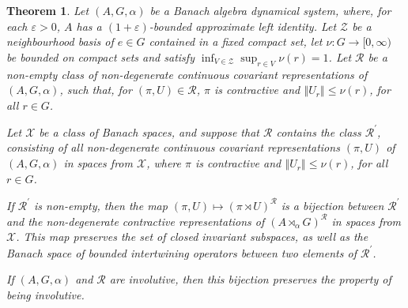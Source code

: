 \documentclass{amsart}
\theoremstyle{plain}
\newtheorem{theorem}{Theorem}[section]
\theoremstyle{definition}
\numberwithin{equation}{section}
\begin{document}
\begin{theorem}\label{t:general_bijection_general_system}
Let ${(A,G,\alpha)}$ be a Banach algebra dynamical system, where, for each ${\varepsilon} >0$, $A$ has a $(1+{\varepsilon})$-bounded approximate left identity. Let $\mathcal{Z}$ be a neighbourhood basis of $e \in G$ contained in a fixed compact set, let $\nu: G \to [0, \infty)$ be bounded on compact sets and satisfy $\inf_{V \in \mathcal{Z}} \sup_{r \in V} \nu(r) = 1$. Let ${\mathcal R}$ be a non-empty class of non-degenerate continuous covariant representations of ${(A,G,\alpha)}$, such that, for ${(\pi,U)}\in{\mathcal R}$, $\pi$ is contractive and ${\left\Vert {U_r} \right\Vert} \leq \nu(r)$, for all $r\in G$.

Let ${\mathcal X}$ be a class of Banach spaces, and suppose that ${\mathcal R}$ contains the class ${\mathcal R}^\prime$, consisting of all non-degenerate continuous covariant representations ${(\pi,U)}$ of ${(A,G,\alpha)}$ in spaces from ${\mathcal X}$, where $\pi$ is contractive and ${\left\Vert {U_r} \right\Vert} \leq \nu(r)$, for all $r\in G$.

If ${\mathcal R}^\prime$ is non-empty, then the map ${(\pi,U)} \mapsto ({\pi \rtimes U})^{\mathcal R}$ is a bijection between ${\mathcal R}^\prime$ and the non-degenerate contractive representations of ${(A {\rtimes}_\alpha G)^\mathcal{R}}$ in spaces from ${\mathcal X}$. This map preserves the set of closed invariant subspaces, as well as the Banach space of bounded intertwining operators between two elements of ${\mathcal R}^\prime$.

If ${(A,G,\alpha)}$ and ${\mathcal R}$ are involutive, then this bijection preserves the property of being involutive.
\end{theorem}
\end{document}
